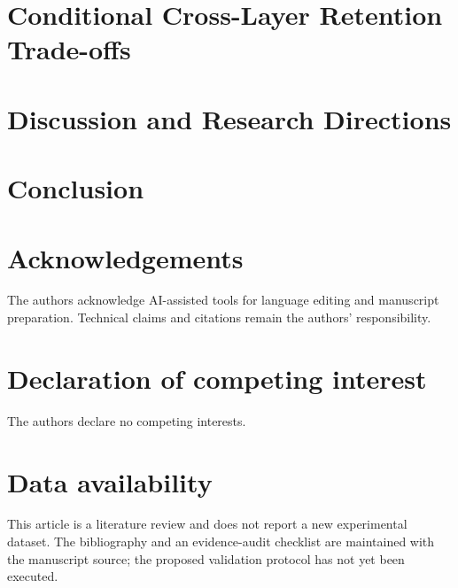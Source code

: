 \documentclass[preprint,12pt]{elsarticle}
\begin{document}
\section{Conditional Cross-Layer Retention Trade-offs}\label{sec:tension}

\section{Discussion and Research Directions}\label{sec:discussion}

\FloatBarrier


\section{Conclusion}\label{sec:conclusion}


\section*{Acknowledgements}
The authors acknowledge AI-assisted tools for language editing and manuscript preparation. Technical claims and citations remain the authors' responsibility.
\section*{Declaration of competing interest}
The authors declare no competing interests.
\section*{Data availability}
This article is a literature review and does not report a new experimental dataset. The bibliography and an evidence-audit checklist are maintained with the manuscript source; the proposed validation protocol has not yet been executed.



\end{document}
